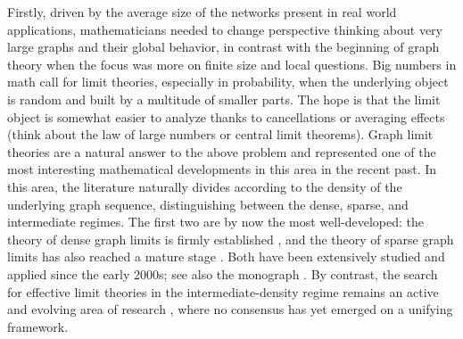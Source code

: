 \documentclass[12pt,twoside,a4paper]{article}
\begin{document}
Firstly, driven by the average size of the networks present in real world applications, mathematicians needed to change perspective thinking about very large graphs and their global behavior, in contrast with the beginning of graph theory when the focus was more on finite size and local questions. Big numbers in math call for limit theories, especially in probability, when the underlying object is random and built by a multitude of smaller parts. The hope is that the limit object is somewhat easier to analyze thanks to cancellations or averaging effects (think about the law of large numbers or central limit theorems). Graph limit theories are a natural answer to the above problem and represented one of the most interesting mathematical developments in this area in the recent past. In this area, the literature naturally divides according to the density of the underlying graph sequence, distinguishing between the dense, sparse, and intermediate regimes. The first two are by now the most well-developed: the theory of dense graph limits is firmly established \cite{BORGS20081801,Lovsz2007SzemerdisLF, LOVASZ2006933,borgs2011convergentAnnals}, and the theory of sparse graph limits has also reached a mature stage \cite{BenjaminiLimit,local-global1,Hatami2014LimitsOL}. Both have been extensively studied and applied since the early 2000s; see also the monograph \cite{LovaszGraphLimits}. By contrast, the search for effective limit theories in the intermediate-density regime remains an active and evolving area of research \cite{MarkovSpaces,KUNSZENTIKOVACS20191,frenkel2018convergence,backhausz2018action,veitch2015classrandomgraphsarising,janson2016graphons,caron2017sparse,borgs2018sparse,borgs2020identifiability,borgs2019sampling,10.1214/18-AOS1778,JANSON2022103549}, where no consensus has yet emerged on a unifying framework.
\end{document}
